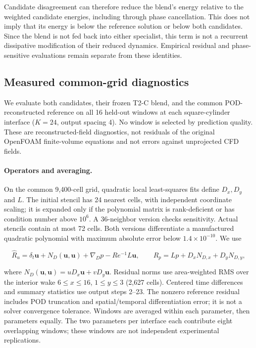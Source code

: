 \documentclass{article}
\providecommand{\DIFaddtex}[1]{{\protect\color{blue} \sf #1}} %
\providecommand{\DIFadd}[1]{\texorpdfstring{\DIFaddtex{#1}}{#1}} %
\begin{document}
\DIFadd{Candidate disagreement can therefore reduce the blend's energy relative to the weighted candidate energies, including through phase cancellation. This does not imply that its energy is below the reference solution or below both candidates. Since the blend is not fed back into either specialist, this term is not a recurrent dissipative modification of their reduced dynamics. Empirical residual and phase-sensitive evaluations remain separate from these identities.
}

\subsection{\DIFadd{Measured common-grid diagnostics}}
\label{app:fusion_measured}
\DIFadd{We evaluate both candidates, their frozen T2-C blend, and the common
POD-reconstructed reference on all 16 held-out windows at each square-cylinder
interface ($K=24$, output spacing 4). No window is selected by prediction
quality. These are reconstructed-field diagnostics, not residuals of the
original OpenFOAM finite-volume equations and not errors against unprojected
CFD fields.
}

\paragraph{\DIFadd{Operators and averaging.}}
\DIFadd{On the common 9,400-cell grid, quadratic local least-squares fits define
$D_x,D_y$ and $L$. The initial stencil has 24 nearest cells, with independent
coordinate scaling; it is expanded only if the polynomial matrix is
rank-deficient or has condition number above $10^6$. A 36-neighbor version
checks sensitivity. Actual stencils contain at most 72 cells. Both versions
differentiate a manufactured quadratic polynomial with maximum absolute
error below $1.4\times10^{-10}$. We use
}



{\color{blue}
\begin{equation}
\widehat R_u=\delta_t\bm u+N_D(\bm u,\bm u)+\nabla_Dp-Re^{-1}L\bm u,
\qquad
\widehat R_p=Lp+D_xN_{D,x}+D_yN_{D,y},
\end{equation}
}



\DIFadd{where $N_D(\bm u,\bm u)=uD_x\bm u+vD_y\bm u$.
Residual norms use area-weighted RMS over the interior wake
$6\leq x\leq16$, $1\leq y\leq3$ (2,627 cells).
Centered time differences and summary statistics use output steps 2--23.
The nonzero reference residual includes POD truncation and spatial/temporal
differentiation error; it is not a solver convergence tolerance. Windows
are averaged within each parameter, then parameters equally. The two
parameters per interface each contribute eight overlapping windows;
these windows are not independent experimental replications.
}
\end{document}
